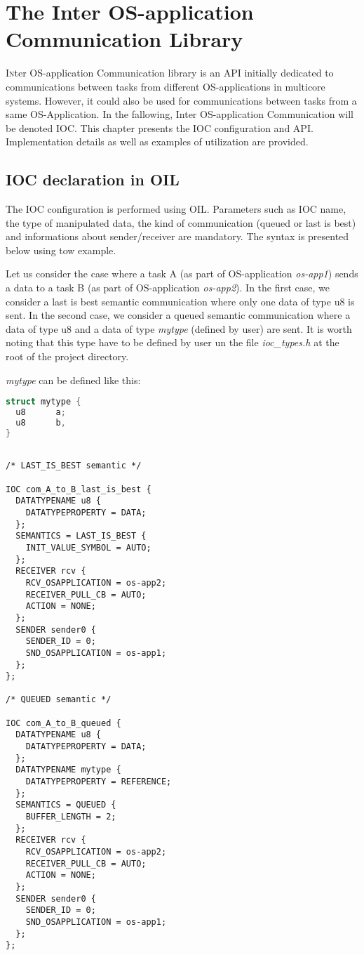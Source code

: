 
\chapter{The Inter OS-application Communication Library}

\lettrine{I}nter OS-application Communication library is an API initially dedicated to communications between tasks from different OS-applications in multicore systems. However, it could also be used for communications between tasks from a same OS-Application. In the fallowing, Inter OS-application Communication will be denoted IOC.
This chapter presents the IOC configuration and API.
Implementation details as well as examples of utilization are provided.

\section{IOC declaration in OIL}

The IOC configuration is performed using OIL. Parameters such as IOC name, the type of manipulated data, the kind of communication (queued or last is best) and informations about sender/receiver are mandatory. The syntax is presented below using tow example.

Let us consider the case where a task A (as part of OS-application \textit{os-app1}) sends a data to a task B (as part of OS-application \textit{os-app2}). 
In the first case, we consider a last is best semantic communication where only one data of type u8 is sent.
In the second case, we consider a queued semantic communication where a data of type u8 and a data of type \textit{mytype} (defined by user) are sent. It is worth noting that this type have to be defined by user un the file \textit{ioc_types.h} at the root of the project directory.

\textit{mytype} can be defined like this:

\begin{lstlisting}[language=C]
struct mytype {
  u8	  a;
  u8	  b,
}
\end{lstlisting}

\begin{lstlisting}[language=OIL]

/* LAST_IS_BEST semantic */

IOC com_A_to_B_last_is_best {
  DATATYPENAME u8 {
    DATATYPEPROPERTY = DATA;
  };
  SEMANTICS = LAST_IS_BEST {
    INIT_VALUE_SYMBOL = AUTO;
  };
  RECEIVER rcv {
    RCV_OSAPPLICATION = os-app2;
    RECEIVER_PULL_CB = AUTO;
    ACTION = NONE;
  };
  SENDER sender0 {
    SENDER_ID = 0;
    SND_OSAPPLICATION = os-app1;
  };
}; 

/* QUEUED semantic */

IOC com_A_to_B_queued {
  DATATYPENAME u8 {
    DATATYPEPROPERTY = DATA;
  };
  DATATYPENAME mytype {
    DATATYPEPROPERTY = REFERENCE;
  };
  SEMANTICS = QUEUED {
    BUFFER_LENGTH = 2;
  };
  RECEIVER rcv {
    RCV_OSAPPLICATION = os-app2;
    RECEIVER_PULL_CB = AUTO;
    ACTION = NONE;
  };
  SENDER sender0 {
    SENDER_ID = 0;
    SND_OSAPPLICATION = os-app1;
  };
}; 

\end{lstlisting}

